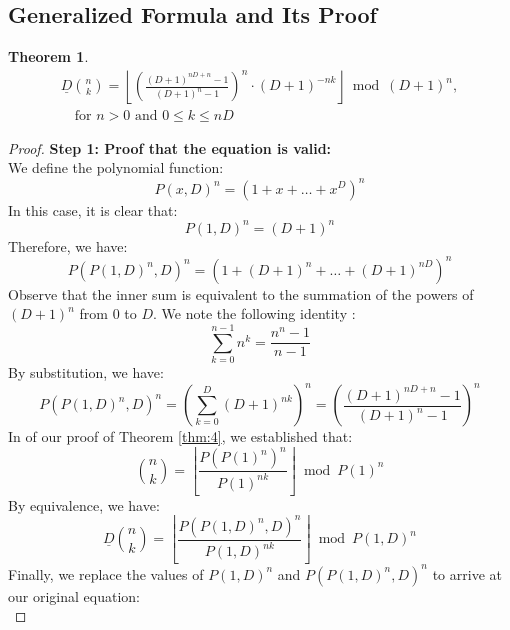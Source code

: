 \documentclass{article}
\theoremstyle{plain}
\newtheorem{thm}{Theorem}
\begin{document}
\subsection{Generalized Formula and Its Proof}

\begin{thm}
\label{thm:5}
\begin{align}
\underline{D}\binom{n}{k} = \left\lfloor \left(\frac{(D+1)^{nD+n} - 1}{(D+1)^{n} - 1}\right)^n \cdot (D + 1)^{-n k}\right\rfloor \bmod (D + 1)^n, \\ \quad \text{for } n > 0 \text{ and } 0 \leq k \leq nD
\end{align}
\end{thm}
\begin{proof}
\textbf{Step 1: Proof that the equation is valid:} \\
We define the polynomial function:
\begin{equation}
P(x,D)^n = (1 + x + \ldots + x^D)^n
\end{equation}
In this case, it is clear that:
\begin{equation}
P(1,D)^n = (D + 1)^n
\end{equation}
Therefore, we have:
\begin{equation}
P(P(1,D)^n,D)^n = (1 + (D+1)^n + \ldots + (D+1)^{n D})^n
\end{equation}
Observe that the inner sum is equivalent to the summation of the powers of $(D+1)^n$ from $0$ to $D$. We note the following identity \cite{A023037}:
\begin{equation}
\sum_{k=0}^{n-1} n^k = \frac{n^{n} - 1}{n - 1}
\end{equation}
By substitution, we have:
\begin{equation}
P(P(1,D)^n,D)^n = \left(\sum_{k=0}^{D} (D+1)^{nk}\right)^n = \left(\frac{(D+1)^{nD+n} - 1}{(D+1)^{n} - 1}\right)^n
\end{equation}
In of our proof of Theorem \ref{thm:4}, we established that:
\begin{equation}
\binom{n}{k} = \left\lfloor\frac{P(P(1)^n)^{n}}{P(1)^{n k}}\right\rfloor \bmod{P(1)^{n}}
\end{equation}
By equivalence, we have:
\begin{equation}
\underline{D}\binom{n}{k} = \left\lfloor\frac{P(P(1,D)^n,D)^{n}}{P(1,D)^{n k}}\right\rfloor \bmod{P(1,D)^{n}}
\end{equation}
Finally, we replace the values of $P(1,D)^n$ and $P(P(1,D)^n,D)^n$ to arrive at our original equation:
\begin{equation}

\end{equation}
\end{proof}
\end{document}
